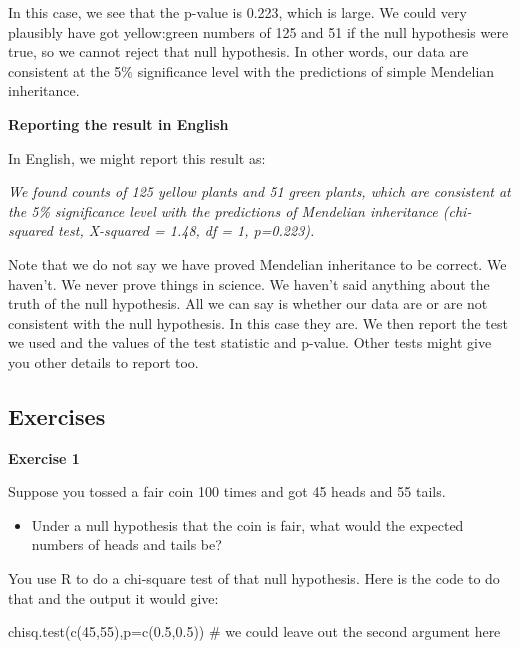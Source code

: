 \documentclass[
  letterpaper,
  DIV=11,
  numbers=noendperiod]{scrreprt}
\newenvironment{Shaded}{\begin{snugshade}}{\end{snugshade}}
\newcommand{\AttributeTok}[1]{\textcolor[rgb]{0.40,0.45,0.13}{#1}}
\newcommand{\CommentTok}[1]{\textcolor[rgb]{0.37,0.37,0.37}{#1}}
\newcommand{\DecValTok}[1]{\textcolor[rgb]{0.68,0.00,0.00}{#1}}
\newcommand{\FloatTok}[1]{\textcolor[rgb]{0.68,0.00,0.00}{#1}}
\newcommand{\FunctionTok}[1]{\textcolor[rgb]{0.28,0.35,0.67}{#1}}
\newcommand{\NormalTok}[1]{\textcolor[rgb]{0.00,0.23,0.31}{#1}}
\providecommand{\tightlist}{%
  \setlength{\itemsep}{0pt}\setlength{\parskip}{0pt}}\usepackage{longtable,booktabs,array}
\begin{document}
In this case, we see that the p-value is 0.223, which is large. We could
very plausibly have got yellow:green numbers of 125 and 51 if the null
hypothesis were true, so we cannot reject that null hypothesis. In other
words, our data are consistent at the 5\% significance level with the
predictions of simple Mendelian inheritance.

\textbf{Reporting the result in English}

In English, we might report this result as:

\emph{We found counts of 125 yellow plants and 51 green plants, which
are consistent at the 5\% significance level with the predictions of
Mendelian inheritance (chi-squared test, X-squared = 1.48, df = 1,
p=0.223).}

Note that we do not say we have proved Mendelian inheritance to be
correct. We haven't. We never prove things in science. We haven't said
anything about the truth of the null hypothesis. All we can say is
whether our data are or are not consistent with the null hypothesis. In
this case they are. We then report the test we used and the values of
the test statistic and p-value. Other tests might give you other details
to report too.

\subsection{Exercises}\label{exercises}

\textbf{Exercise 1}

Suppose you tossed a fair coin 100 times and got 45 heads and 55 tails.

\begin{itemize}
\tightlist
\item
  Under a null hypothesis that the coin is fair, what would the expected
  numbers of heads and tails be?
\end{itemize}

You use R to do a chi-square test of that null hypothesis. Here is the
code to do that and the output it would give:

\begin{Shaded}
\begin{Highlighting}[]
\FunctionTok{chisq.test}\NormalTok{(}\FunctionTok{c}\NormalTok{(}\DecValTok{45}\NormalTok{,}\DecValTok{55}\NormalTok{),}\AttributeTok{p=}\FunctionTok{c}\NormalTok{(}\FloatTok{0.5}\NormalTok{,}\FloatTok{0.5}\NormalTok{)) }\CommentTok{\# we could leave out the second argument here}
\end{Highlighting}
\end{Shaded}
\end{document}
